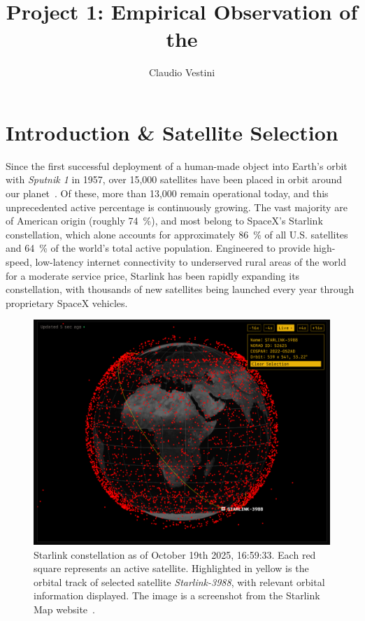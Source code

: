 \documentclass{article}
\title{Project 1: Empirical Observation of the }
\author{Claudio Vestini}
\begin{document}
\maketitle

\section{Introduction \& Satellite Selection}

Since the first successful deployment of a human-made object into Earth's orbit with \textit{Sputnik 1} in 1957, over 15,000 satellites have been placed in orbit around our planet~\cite{lookup-lepoint2025}. Of these, more than 13,000 remain operational today, and this unprecedented active percentage is continuously growing. The vast majority are of American origin (roughly \SI{74}{\percent}), and most belong to SpaceX's Starlink constellation, which alone accounts for approximately \SI{86}{\percent} of all U.S. satellites and \SI{64}{\percent} of the world's total active population. Engineered to provide high-speed, low-latency internet connectivity to underserved rural areas of the world for a moderate service price, Starlink has been rapidly expanding its constellation, with thousands of new satellites being launched every year through proprietary SpaceX vehicles.

\begin{figure}[h!]
    \centering
    \includegraphics[width=\textwidth]{LaTeX/Figures/Starlink Constellation.png}
    \caption{Starlink constellation as of October 19th 2025, 16:59:33. Each red square represents an active satellite. Highlighted in yellow is the orbital track of selected satellite \textit{Starlink-3988}, with relevant orbital information displayed. The image is a screenshot from the Starlink Map website~\cite{starlinkmap.org}.}
    \label{fig:constellation}
\end{figure}
\end{document}
